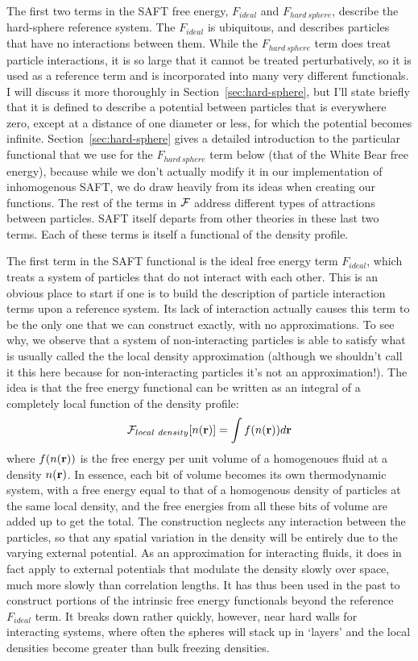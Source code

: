 The first two terms in the SAFT free energy, $F_{ideal}$ and
$F_{hard~sphere}$, describe the hard-sphere reference system.  The
$F_{ideal}$ is ubiquitous, and describes particles that have no
interactions between them.  While the $F_{hard~sphere}$ term does
treat particle interactions, it is so large that it cannot be treated
perturbatively, so it is used as a reference term and is incorporated
into many very different functionals.  I will discuss it more
thoroughly in Section~\ref{sec:hard-sphere}, but I'll state briefly
that it is defined to describe a potential between particles that is
everywhere zero, except at a distance of one diameter or less, for
which the potential becomes infinite.  Section~\ref{sec:hard-sphere}
gives a detailed introduction to the particular functional that we use
for the $F_{hard~sphere}$ term below (that of the White Bear free
energy), because while we don't actually modify it in our
implementation of inhomogenous SAFT, we do draw heavily from its ideas
when creating our functions.  The rest of the terms in $\mathcal{F}$ address
different types of attractions between particles.  SAFT itself departs
from other theories in these last two terms.  Each of these terms is
itself a functional of the density profile.


The first term in the SAFT functional is the ideal free energy term
$F_{ideal}$, which treats a system of particles that do not interact
with each other.  This is an obvious place to start if one is to build
the description of particle interaction terms upon a reference system.
Its lack of interaction actually causes this term to be the only one
that we can construct exactly, with no approximations.  To see why, we
observe that a system of non-interacting particles is able to satisfy
what is usually called the the local density approximation (although
we shouldn't call it this here because for non-interacting particles
it's not an approximation!).  The idea is that the free energy
functional can be written as an integral of a completely local
function of the density profile:
\begin{align}
  \mathcal{F}_{local~density}[n(\textbf{r})] = \int f(n(\textbf{r})) d\textbf{r}
\end{align}
where $f(n(\textbf{r}))$ is the free energy per unit volume of a homogenoues
fluid at a density $n(\textbf{r})$.  In essence, each bit of volume becomes
its own thermodynamic system, with a free energy equal to that of a
homogenous density of particles at the same local density, and the
free energies from all these bits of volume are added up to get the
total.  The construction neglects any interaction between the
particles, so that any spatial variation in the density will be
entirely due to the varying external potential.  As an approximation
for interacting fluids, it does in fact apply to external potentials
that modulate the density slowly over space, much more slowly than
correlation lengths.  It has thus been used in the past to construct
portions of the intrinsic free energy functionals beyond the reference
$F_{ideal}$ term.  It breaks down rather quickly, however, near hard
walls for interacting systems, where often the spheres will stack up
in `layers' and the local densities become greater than bulk freezing
densities.

